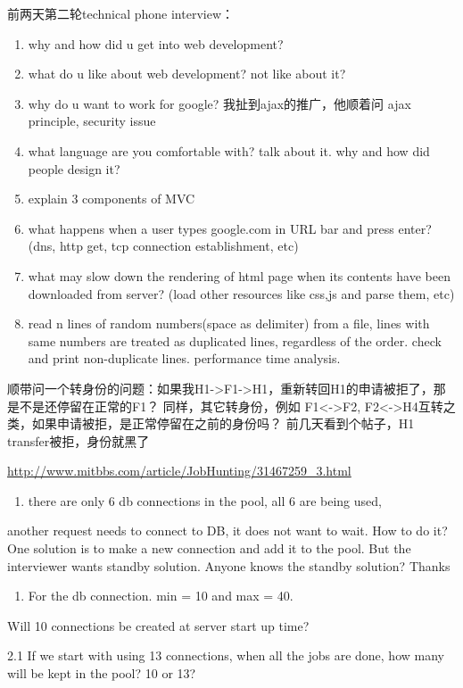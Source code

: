 \documentclass[12pt]{book}
\begin{document}
前两天第二轮technical phone interview：

\begin{enumerate}
\item why and how did u get into web development?
\item what do u like about web development? not like about it?
\item why do u want to work for google? 我扯到ajax的推广，他顺着问 ajax principle, security issue
\item what language are you comfortable with? talk about it. why and how did people design it?
\item explain 3 components of MVC
\item what happens when a user types google.com in URL bar and press enter?(dns, http get, tcp connection establishment, etc)
\item what may slow down the rendering of html page when its contents have been downloaded from server? (load other resources like css,js and parse them, etc)
\item read n lines of random numbers(space as delimiter) from a file, lines with same numbers are treated as duplicated lines, regardless of the order. check and print non-duplicate lines. performance time analysis.
\end{enumerate}

顺带问一个转身份的问题：如果我H1->F1->H1，重新转回H1的申请被拒了，那是不是还停留在正常的F1？ 同样，其它转身份，例如 F1<->F2, F2<->H4互转之类，如果申请被拒，是正常停留在之前的身份吗？ 前几天看到个帖子，H1 transfer被拒，身份就黑了

\url{http://www.mitbbs.com/article/JobHunting/31467259_3.html}

\begin{enumerate}
\item there are only 6 db connections in the pool, all 6 are being used,
\end{enumerate}
another request needs to connect to DB, it does not want to wait. How to do 
it? One solution is to make a new connection and add it to the pool. But the
interviewer wants standby solution. Anyone knows the standby solution? 
Thanks

\begin{enumerate}
\item For the db connection. min = 10 and max = 40.
\end{enumerate}
Will 10 connections be created at server start up time?

2.1 If we start with using 13 connections, when all the jobs are done, how 
many will be kept in the pool? 10 or 13?
\end{document}
